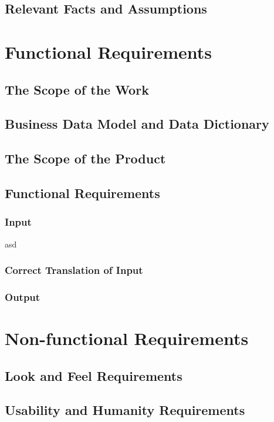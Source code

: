 \documentclass[12pt]{report}
\begin{document}
\section{Relevant Facts and Assumptions}\label{sec:Assumptions}



\chapter{Functional Requirements}\label{ch:Functional}
\section{The Scope of the Work}\label{sec:ScopeOfWork}
\section{Business Data Model and Data Dictionary}\label{sec:DataModel}
\section{The Scope of the Product}\label{sec:ScopeOfProduct}
\section{Functional Requirements}\label{sec:Functional}
\subsection{Input}
asd
\subsection{Correct Translation of Input}
\subsection{Output}

\chapter{Non-functional Requirements}\label{ch:NonFunc}
\section{Look and Feel Requirements}\label{sec:LookAndFeel} 
\section{Usability and Humanity Requirements}\label{sec:Usability}
\end{document}
